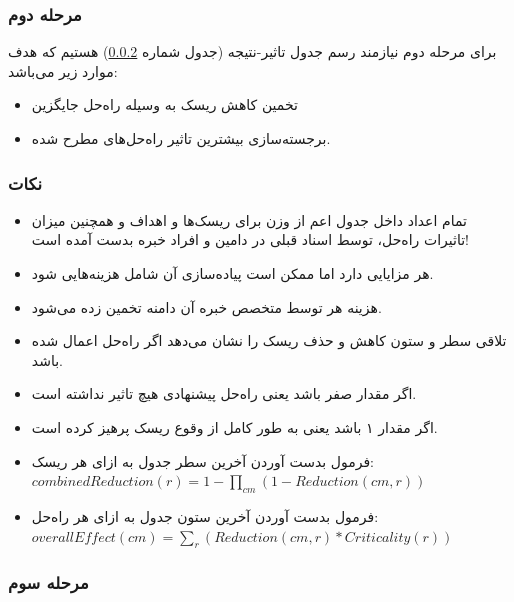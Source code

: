 \subsubsection{مرحله دوم }

برای مرحله دوم نیازمند رسم جدول تاثیر-نتیجه (جدول شماره \ref{}) هستیم که هدف
موارد زیر می‌باشد:

\begin{itemize}
    \item تخمین کاهش ریسک به وسیله راه‌حل جایگزین
    \item برجسته‌سازی بیشترین تاثیر راه‌حل‌های مطرح شده.
\end{itemize}

\subsubsection*{نکات}

\begin{itemize}
    \item تمام اعداد داخل جدول اعم از وزن‌ برای ریسک‌ها و اهداف و همچنین میزان
    تاثیرات راه‌حل، توسط اسناد قبلی در دامین و افراد خبره بدست آمده است!
\end{itemize}

\begin{itemize}
    \item هر  مزایایی دارد اما ممکن است پیاده‌سازی آن شامل
    هزینه‌هایی شود.
    \item هزینه هر  توسط متخصص خبره آن دامنه تخمین زده
    می‌شود.
    \item تلاقی سطر و ستون کاهش و حذف ریسک را نشان می‌دهد اگر راه‌حل اعمال شده
    باشد.
    \item اگر مقدار صفر باشد یعنی راه‌حل پیشنهادی هیچ تاثیر نداشته است.
    \item اگر مقدار ۱ باشد یعنی به طور کامل از وقوع ریسک پرهیز کرده است.
    \item فرمول بدست آوردن آخرین سطر جدول به ازای هر ریسک: $combinedReduction(r) = 1 - \prod_{cm}(1 - Reduction(cm, r))$
    \item فرمول بدست آوردن آخرین ستون جدول به ازای هر راه‌حل: $overallEffect(cm) = \sum_{r}(Reduction(cm, r) * Criticality(r))$
\end{itemize}

\subsubsection{مرحله سوم }
